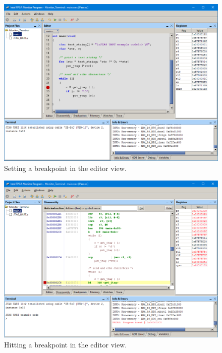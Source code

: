 \documentclass[11pt, twoside, pdftex]{article}
\begin{document}
\begin{figure}[h]
	\begin{center}
		\includegraphics[scale=0.4]{screenshots/AMP_editor_breakpoint.png}
	\end{center}
	\caption{Setting a breakpoint in the editor view.}
	\label{fig:AMP_editor_breakpoint}
\end{figure}

\begin{figure}[h]
	\begin{center}
		\includegraphics[scale=0.4]{screenshots/AMP_editor_breakpointhit.png}
	\end{center}
	\caption{Hitting a breakpoint in the editor view.}
	\label{fig:AMP_editor_breakpointhit}
\end{figure}
\end{document}
